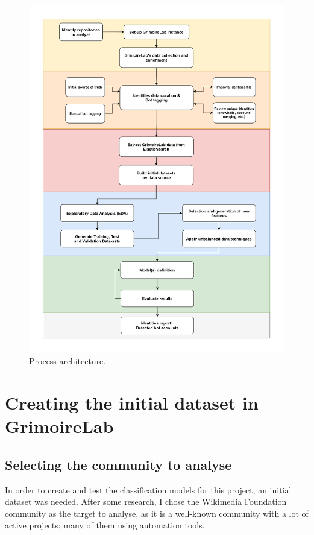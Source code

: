 \documentclass[a4paper, 12pt]{book}
\begin{document}
\begin{figure}
  \centering
  \includegraphics[width=16.5cm, keepaspectratio]{img/sections-architechture-revelio.png}
  \caption{Process architecture.}
  \label{fig:process-arch}
\end{figure}

\section{Creating the initial dataset in GrimoireLab} 
\label{sec:creating-dataset}

\subsection{Selecting the community to analyse}
\label{ssec:selecting-community}
In order to create and test the classification models for this project, an initial dataset was needed. After some research, I chose the Wikimedia Foundation community as the target to analyse, as it is a well-known community with a lot of active projects; many of them using automation tools.
\end{document}
